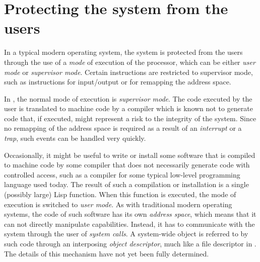 \section{Protecting the system from the users}

In a typical modern operating system, the system is protected from the
users through the use of a \emph{mode} of execution of the processor,
which can be either \emph{user mode} or \emph{supervisor mode}.
Certain instructions are restricted to supervisor mode, such as
instructions for input/output or for remapping the address space. 

In \sysname{}, the normal mode of execution is \emph{supervisor mode}.
The code executed by the user is translated to machine code by a
compiler which is known not to generate code that, if executed, might
represent a risk to the integrity of the system.  Since no remapping
of the address space is required as a result of an \emph{interrupt} or
a \emph{trap}, such events can be handled very quickly.

Occasionally, it might be useful to write or install some software
that is compiled to machine code by some compiler that does not
necessarily generate code with controlled access, such as a compiler
for some typical low-level programming language used today.  The
result of such a compilation or installation is a single (possibly
large) Lisp function.  When this function is executed, the mode of
execution is switched to \emph{user mode}.  As with traditional modern
operating systems, the code of such software has its own \emph{address
  space}, which means that it can not directly manipulate \sysname{}
capabilities.  Instead, it has to communicate with the system through
the user of \emph{system calls}.  A system-wide object is referred to
by such code through an interposing \emph{object descriptor}, much
like a file descriptor in \unix{}.  The details of this mechanism have
not yet been fully determined.


